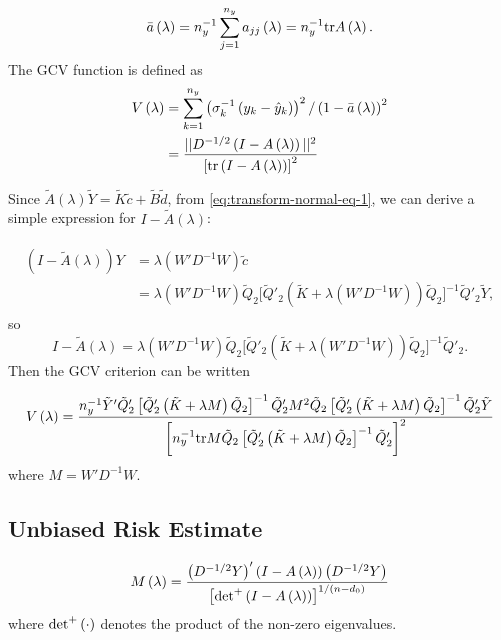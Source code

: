 \documentclass[12pt]{article}
\newcommand{\tildeK}{\tilde{K}}
\newcommand{\tildec}{\tilde{c}}
\newcommand{\tildeB}{\tilde{B}}
\newcommand{\tilded}{\tilde{d}}
\newcommand{\tildeY}{\tilde{Y}}
\newcommand{\tildeQ}{\tilde{Q}}
\newcommand{\tildeA}{\tilde{A}}
\theoremstyle{definition}
\begin{document}
\[
\bar{a}\left(\lambda\right) = n_y^{-1}\sum_{j=1}^{n_y} a_{jj}\left(\lambda\right) = n_y^{-1} \textup{tr}A\left(\lambda\right).
\]
The GCV function is defined as 
\begin{align}
\begin{split}
V\left(\lambda\right) &=  \sum_{k=1}^{n_y} \left(\sigma_{k}^{-1} \left(y_k - \hat{y}_k\right) \right)^2/ \left(1-\bar{a}\left(\lambda\right) \right)^2\\
&=\frac{ \vert \vert D^{-1/2}\left(I- A\left(\lambda\right) \right) \vert \vert^2}{\left[\textup{tr}\left(I- A\left(\lambda\right) \right) \right]^2}
\end{split}
\end{align}

Since $\tildeA \left(\lambda\right) \tildeY = \tildeK \tildec + \tildeB \tilded$, from \ref{eq:transform-normal-eq-1}, we can derive a simple expression for $I -\tildeA \left(\lambda\right)$:

\begin{align}
\begin{split} \label{eq:I-minus-A}
\left(I -\tildeA \left(\lambda\right)\right)Y &= \lambda \left(W'D^{-1}W\right) \tildec \\
&= \lambda \left(W'D^{-1}W\right)  \tildeQ_2\bigg[ \tildeQ'_2 \left( \tildeK + \lambda \left( W' D^{-1} W \right) \right)\tildeQ_2 \bigg]^{-1} \tildeQ'_2 \tildeY,
\end{split}
\end{align}
\bigskip
\noindent
so 
\[
I -\tildeA \left(\lambda\right) = \lambda \left(W'D^{-1}W\right)  \tildeQ_2\bigg[ \tildeQ'_2 \left( \tildeK + \lambda \left( W' D^{-1} W \right) \right)\tildeQ_2 \bigg]^{-1} \tildeQ'_2 .
\]
\noindent
Then the GCV criterion can be written

\begin{equation}
V\left(\lambda\right) = \frac{n_y^{-1}  \tildeY'\tildeQ'_2\left[\tildeQ'_2\left(\tildeK +  \lambda M  \right)\tildeQ_2  \right]^{-1}\tildeQ'_2 M^2 \tildeQ_2 \left[\tildeQ'_2\left(\tildeK +\lambda M\right)\tildeQ_2  \right]^{-1}\tildeQ'_2 \tildeY }{\bigg[ n_y^{-1} \textup{tr}M \tildeQ_2\left[ \tildeQ'_2 \left( \tildeK + \lambda M \right) \tildeQ_2 \right]^{-1} \tildeQ'_2 \bigg]^2} 
\end{equation}
\bigskip
\noindent
where $M = W' D^{-1} W$.

\subsection{Unbiased Risk Estimate}
\[
M\left(\lambda\right) = \frac{ \left(D^{-1/2}Y\right)' \left( I - A\left(\lambda\right)\right) \left(D^{-1/2}Y\right)}{\left[\textup{det}^+ \left( I - A\left(\lambda\right)\right) \right]^{1/\left(n-d_0\right)}}
\]
\noindent
where $\textup{det}^+\left(\cdot\right)$ denotes the product of the non-zero eigenvalues.
\end{document}
